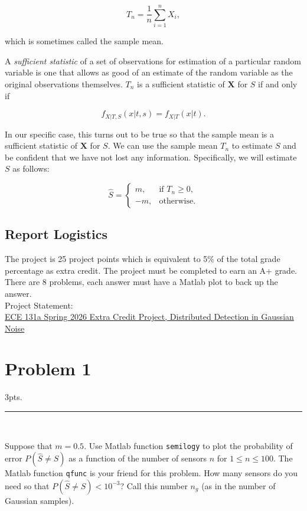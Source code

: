 \documentclass[12pt,a4paper]{article}
\begin{document}
\[
T_n = \frac{1}{n}\sum_{i=1}^{n} X_i,
\]

which is sometimes called the sample mean.

A \emph{sufficient statistic} of a set of observations for estimation of a
particular random variable is one that allows as good of an estimate of the
random variable as the original observations themselves.
$T_n$ is a sufficient statistic of $\mathbf{X}$ for $S$ if and only if

\[
f_{X|T,S}(x|t,s) = f_{X|T}(x|t).
\]

In our specific case, this turns out to be true so that the sample mean is a
sufficient statistic of $\mathbf{X}$ for $S$. We can use the sample mean
$T_n$ to estimate $S$ and be confident that we have not lost any information.
Specifically, we will estimate $S$ as follows:

\[
\hat{S} =
\begin{cases}
m, & \text{if } T_n \ge 0,\\[4pt]
-m, & \text{otherwise}.
\end{cases}
\]

\subsection{Report Logistics}
The project is 25 project points which is equivalent to 5\% of the total grade percentage as extra credit.   The project must be completed to earn an A+ grade.\\
There are 8 problems, each answer must have a Matlab plot to back up the answer. \\

Project Statement:\\
\noindent \href{https://drive.google.com/drive/folders/1uo9Ji4P91C4RJN64mATiQfMw05c1TiUV}{ECE 131a Spring 2026 Extra Credit Project, Distributed Detection in Gaussian Noise}


\section{Problem 1}
3pts.\\

\hrule 

\

\noindent Suppose that $m = 0.5$. Use Matlab function \texttt{semilogy} to plot the probability of error $P(\hat{S} \neq S)$ as a function of the number of sensors $n$ for $1 \leq n \leq 100$. The Matlab function \texttt{qfunc} is your friend for this problem. How many sensors do you need so that $P(\hat{S} \neq S) < 10^{-3}$? Call this number $n_g$ (as in the number of Gaussian samples).\\
\end{document}
